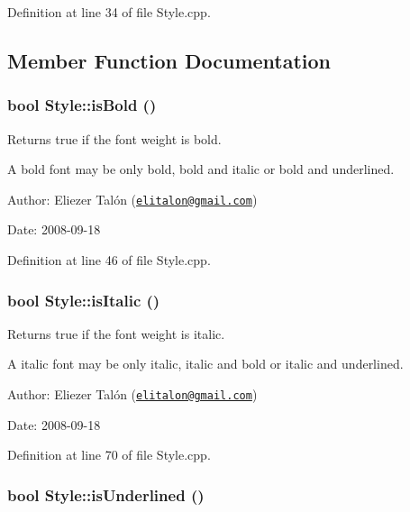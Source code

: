 Definition at line 34 of file Style.cpp.

\subsection{Member Function Documentation}
\hypertarget{class_style_7f1c573688f781a3d6081194c84affba}{
\subsubsection[isBold]{\setlength{\rightskip}{0pt plus 5cm}bool Style::isBold ()}}
\label{class_style_7f1c573688f781a3d6081194c84affba}


Returns true if the font weight is bold. 

A bold font may be only bold, bold and italic or bold and underlined.

\begin{Desc}
\item[Author:]Eliezer Talón (\href{mailto:elitalon@gmail.com}{\tt elitalon@gmail.com}) \end{Desc}
\begin{Desc}
\item[Date:]2008-09-18 \end{Desc}


Definition at line 46 of file Style.cpp.\hypertarget{class_style_a1f4e590f1d15f37fddda4d1a7efeb51}{
\subsubsection[isItalic]{\setlength{\rightskip}{0pt plus 5cm}bool Style::isItalic ()}}
\label{class_style_a1f4e590f1d15f37fddda4d1a7efeb51}


Returns true if the font weight is italic. 

A italic font may be only italic, italic and bold or italic and underlined.

\begin{Desc}
\item[Author:]Eliezer Talón (\href{mailto:elitalon@gmail.com}{\tt elitalon@gmail.com}) \end{Desc}
\begin{Desc}
\item[Date:]2008-09-18 \end{Desc}


Definition at line 70 of file Style.cpp.\hypertarget{class_style_25d84b39fcd4fb608a1b323c99ea8678}{
\subsubsection[isUnderlined]{\setlength{\rightskip}{0pt plus 5cm}bool Style::isUnderlined ()}}
\label{class_style_25d84b39fcd4fb608a1b323c99ea8678}


